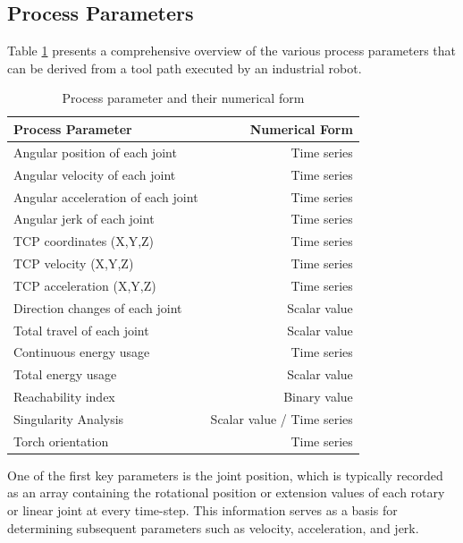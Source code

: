 
\subsection{Process Parameters}\label{pp}


Table \ref{procesparameters} presents a comprehensive overview of the various process parameters that can be derived from a tool path executed by an industrial robot. 


\begin{table}[H]
	\centering
	\begin{tabular}{||l|r||}
		\hline
		Process Parameter & Numerical Form\\
		\hline
		\hline
		\hline
		Angular position of each joint & Time series\\
		Angular velocity of each joint & Time series\\
		Angular acceleration of each joint& Time series\\
		Angular jerk of each joint& Time series\\
		\hline
		\hline	
		
		TCP coordinates (X,Y,Z) & Time series\\
		TCP velocity (X,Y,Z) & Time series\\
		TCP acceleration (X,Y,Z) & Time series\\
		\hline
		\hline
		Direction changes of each joint& Scalar value\\
		Total travel of each joint& Scalar value\\		
		
		\hline
		\hline
		Continuous energy usage & Time series\\
		Total energy usage & Scalar value\\
		\hline
		\hline
		Reachability index & Binary value\\
		Singularity Analysis & Scalar value / Time series\\
		Torch orientation & Time series\\
		
		
		\hline
		\hline
		
	\end{tabular}
	
	
	\caption{Process parameter and their numerical form}
	\label{procesparameters}
\end{table}

One of the first key parameters is the joint position, which is typically recorded as an array containing the rotational position or extension values of each rotary or linear joint at every time-step. This information serves as a basis for determining subsequent parameters such as velocity, acceleration, and jerk.
 
